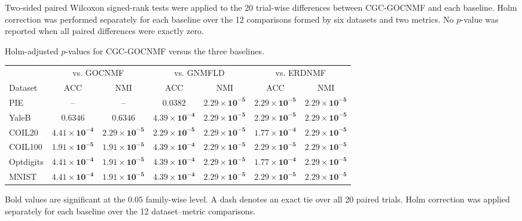 \documentclass[11pt]{article}
\newenvironment{widetable}
  {\begin{strip}\centering\captionsetup{type=table}}
  {\end{strip}}
\theoremstyle{remark}
\begin{document}
Two-sided paired Wilcoxon signed-rank tests were applied to the 20 trial-wise differences between CGC-GOCNMF and each baseline. Holm correction was performed separately for each baseline over the 12 comparisons formed by six datasets and two metrics. No $p$-value was reported when all paired differences were exactly zero.

\begin{widetable}
\centering
\caption{Holm-adjusted $p$-values for CGC-GOCNMF versus the three baselines.}
\label{tab:holm}
\small
\setlength{\tabcolsep}{10.7pt}
\begin{tabular}{lcccccc}
\toprule
& \multicolumn{2}{c}{vs. GOCNMF} & \multicolumn{2}{c}{vs. GNMFLD} & \multicolumn{2}{c}{vs. ERDNMF} \\
\cmidrule(lr){2-3}\cmidrule(lr){4-5}\cmidrule(lr){6-7}
Dataset & ACC & NMI & ACC & NMI & ACC & NMI \\
\midrule
PIE & -- & -- & $\mathbf{0.0382}$ & $\mathbf{2.29\times10^{-5}}$ & $\mathbf{2.29\times10^{-5}}$ & $\mathbf{2.29\times10^{-5}}$ \\
YaleB & $0.6346$ & $0.6346$ & $\mathbf{4.39\times10^{-4}}$ & $\mathbf{2.29\times10^{-5}}$ & $\mathbf{2.29\times10^{-5}}$ & $\mathbf{2.29\times10^{-5}}$ \\
COIL20 & $\mathbf{4.41\times10^{-4}}$ & $\mathbf{2.29\times10^{-5}}$ & $\mathbf{2.29\times10^{-5}}$ & $\mathbf{2.29\times10^{-5}}$ & $\mathbf{1.77\times10^{-4}}$ & $\mathbf{2.29\times10^{-5}}$ \\
COIL100 & $\mathbf{1.91\times10^{-5}}$ & $\mathbf{1.91\times10^{-5}}$ & $\mathbf{4.39\times10^{-4}}$ & $\mathbf{2.29\times10^{-5}}$ & $\mathbf{2.29\times10^{-5}}$ & $\mathbf{2.29\times10^{-5}}$ \\
Optdigits & $\mathbf{4.41\times10^{-4}}$ & $\mathbf{1.91\times10^{-5}}$ & $\mathbf{4.39\times10^{-4}}$ & $\mathbf{2.29\times10^{-5}}$ & $\mathbf{1.77\times10^{-4}}$ & $\mathbf{2.29\times10^{-5}}$ \\
MNIST & $\mathbf{4.41\times10^{-4}}$ & $\mathbf{1.91\times10^{-5}}$ & $\mathbf{4.39\times10^{-4}}$ & $\mathbf{2.29\times10^{-5}}$ & $\mathbf{2.29\times10^{-5}}$ & $\mathbf{2.29\times10^{-5}}$ \\
\bottomrule
\end{tabular}%

\vspace{1mm}
\parbox{0.98\linewidth}{\footnotesize Bold values are significant at the $0.05$ family-wise level. A dash denotes an exact tie over all 20 paired trials. Holm correction was applied separately for each baseline over the 12 dataset--metric comparisons.}
\end{widetable}
\end{document}
